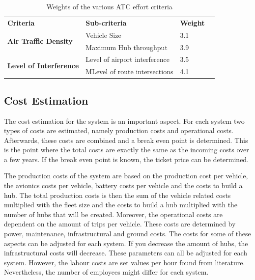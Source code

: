 \begin{table}[H]
\captionsetup{justification=centering}
\caption{Weights of the various ATC effort criteria}
\label{UAM-effort}
\centering
\begin{tabular}{|l|l|l|l}
\cline{1-3}
\textbf{Criteria}  &     \textbf{Sub-criteria}   & \textbf{Weight}  \\ \cline{1-3}
\multirow{2}{*}{\textbf{Air Traffic Density}} & Vehicle Size  &  3.1  \\ \cline{2-3}
                                         & Maximum Hub throughput &  3.9 \\ \cline{1-3}
\multirow{2}{*}{\textbf{Level of Interference}} & Level of airport interference  & 3.5   \\ \cline{2-3}
                                         & MLevel of route intersections & 4.1  \\ \cline{1-3}

\end{tabular}

\end{table}















\subsection{Cost Estimation}
The cost estimation for the system is an important aspect. For each system two types of costs are estimated, namely production costs and operational costs. Afterwards, these costs are combined and a break even point is determined. This is the point where the total costs are exactly the same as the incoming costs over a few years. If the break even point is known, the ticket price can be determined. 

The production costs of the system are based on the production cost per vehicle, the avionics costs per vehicle, battery costs per vehicle and the costs to build a hub. The total production costs is then the sum of the vehicle related costs multiplied with the fleet size and the costs to build a hub multiplied with the number of hubs that will be created. Moreover, the operational costs are dependent on the amount of trips per vehicle. These costs are determined by power, maintenance, infrastructural and ground costs. The costs for some of these aspects can be adjusted for each system. If you decrease the amount of hubs, the infrastructural costs will decrease. These parameters can all be adjusted for each system. However, the labour costs are set values per hour found from literature. Nevertheless, the number of employees might differ for each system. 

